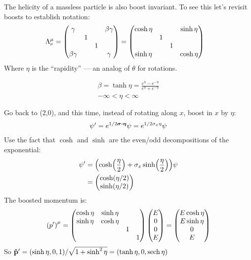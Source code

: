 The helicity of a massless particle is also boost invariant. To see this let's revisit boosts to establish notation:
\begin{align*}
  \Lambda^\mu_\nu&=\pmqty{\gamma&&&\beta\gamma\\&1\\&&1\\\beta\gamma&&&\gamma}
  =\pmqty{\cosh\eta&&&\sinh\eta\\&1\\&&1\\\sinh\eta&&&\cosh\eta}
\end{align*}
Where $\eta$ is the ``rapidity'' --- an analog of $\theta$ for rotations.

\begin{gather*}
  \beta=\tanh\eta=\frac{e^\eta-e^{-\eta}}{e^\eta+e^{-\eta}}\\
  -\infty<\eta<\infty
\end{gather*}

Go back to (2,0), and this time, instead of rotating along $x$, boost in $x$ by $\eta$:
\begin{align*}
  \psi'=e^{1/2\bm{\sigma}\vdot\bm{\eta}}\psi=e^{1/2\sigma_x\eta}\psi
\end{align*}
Use the fact that $\cosh$ and $\sinh$ are the even/odd decompositions of the exponential:
\begin{align*}
  \psi'&=\qty(\cosh(\frac\eta2)+\sigma_x\sinh(\frac\eta2))\psi\\
  &=\pmqty{\cosh(\eta/2)\\\sinh(\eta/2)}
\end{align*}
The boosted momentum is:
\begin{align*}
  {(p')}^\mu=\pmqty{\cosh\eta&\sinh\eta\\\sinh\eta&\cosh\eta\\&&1\\&&&1}
  \pmqty{E\\0\\0\\E}=\pmqty{E\cosh\eta\\E\sinh\eta\\0\\E}
\end{align*}
So $\vu{p}'=(\sinh\eta,0,1)/\sqrt{1+\sinh^2\eta}=(\tanh\eta,0,\sech\eta)$

